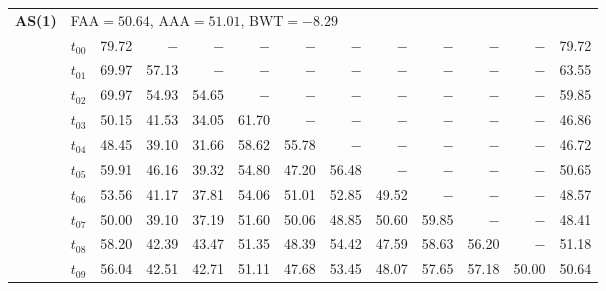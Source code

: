 \begin{table}[ht]
\begin{tabular}{@{}l l r r r r r r r r r r r@{}}
\midrule
\multirow{11}{*}{\textbf{AS(1)}} & \multicolumn{12}{l}{\quad\small FAA$=50.64$,\; AAA$=51.01$,\; BWT$=-8.29$} \\
 & $t_{00}$ & 79.72 & $-$ & $-$ & $-$ & $-$ & $-$ & $-$ & $-$ & $-$ & $-$ & 79.72 \\
 & $t_{01}$ & 69.97 & 57.13 & $-$ & $-$ & $-$ & $-$ & $-$ & $-$ & $-$ & $-$ & 63.55 \\
 & $t_{02}$ & 69.97 & 54.93 & 54.65 & $-$ & $-$ & $-$ & $-$ & $-$ & $-$ & $-$ & 59.85 \\
 & $t_{03}$ & 50.15 & 41.53 & 34.05 & 61.70 & $-$ & $-$ & $-$ & $-$ & $-$ & $-$ & 46.86 \\
 & $t_{04}$ & 48.45 & 39.10 & 31.66 & 58.62 & 55.78 & $-$ & $-$ & $-$ & $-$ & $-$ & 46.72 \\
 & $t_{05}$ & 59.91 & 46.16 & 39.32 & 54.80 & 47.20 & 56.48 & $-$ & $-$ & $-$ & $-$ & 50.65 \\
 & $t_{06}$ & 53.56 & 41.17 & 37.81 & 54.06 & 51.01 & 52.85 & 49.52 & $-$ & $-$ & $-$ & 48.57 \\
 & $t_{07}$ & 50.00 & 39.10 & 37.19 & 51.60 & 50.06 & 48.85 & 50.60 & 59.85 & $-$ & $-$ & 48.41 \\
 & $t_{08}$ & 58.20 & 42.39 & 43.47 & 51.35 & 48.39 & 54.42 & 47.59 & 58.63 & 56.20 & $-$ & 51.18 \\
 & $t_{09}$ & 56.04 & 42.51 & 42.71 & 51.11 & 47.68 & 53.45 & 48.07 & 57.65 & 57.18 & 50.00 & 50.64 \\
\bottomrule
\end{tabular}
\end{table}

